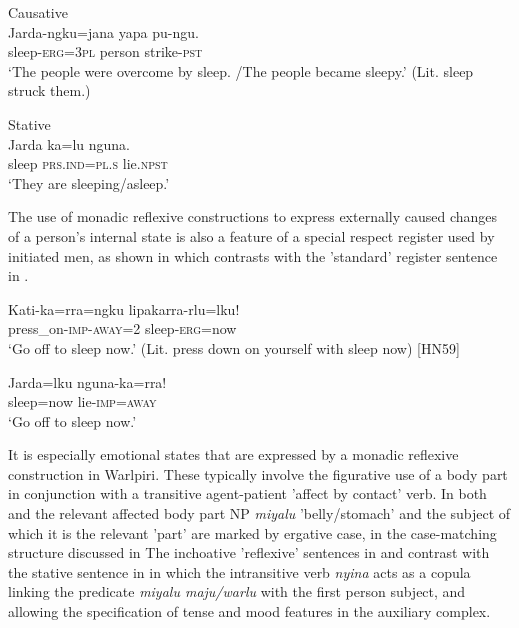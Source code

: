\documentclass[output=paper]{../langscibook}
\begin{document}
\ex Causative\\
\label{ex:laughren:41b}
\gll  Jarda-ngku=jana  yapa  pu-ngu. \\
    sleep-\textsc{erg=3pl}  person  strike-\textsc{pst}\\
\glt `The people were overcome by sleep. /The people became sleepy.'
  (Lit. sleep struck them.)

\ex Stative\\
\label{ex:laughren:41c}
\gll  Jarda  ka=lu  nguna. \\
    sleep  \textsc{prs.ind=pl.s}  lie.\textsc{npst}\\
\glt `They are sleeping/asleep.'
\z
\z


The use of monadic reflexive constructions to express externally caused changes of a person's internal state is also a feature of a special respect register used by initiated men, as shown in  which contrasts with the 'standard' register sentence in .

\ea%
    \label{ex:laughren:42}
\ea
\label{ex:laughren:42a}
\gll  Kati-ka=rra=ngku   lipakarra-rlu=lku!\\
  press\_on-\textsc{imp-away=2}  sleep\textsc{{}-erg=}now\\
\glt `Go off to sleep now.' (Lit. press down on yourself with sleep now) [HN59]

\ex
\label{ex:laughren:42b}
\gll  Jarda=lku   nguna-ka=rra!\\
 sleep=now  lie-\textsc{imp=away}\\
\glt `Go off to sleep now.'
\z
\z


It is especially emotional states that are expressed by a monadic reflexive construction in Warlpiri. These typically involve the figurative use of a body part in conjunction with a transitive agent-patient 'affect by contact' verb. In both  and  the relevant affected body part NP \textit{miyalu} 'belly/stomach' and the subject of which it is the relevant 'part' are marked by ergative case, in the case-matching structure discussed in  The inchoative 'reflexive' sentences in  and  contrast with the stative sentence in  in which the intransitive verb \textit{nyina} acts as a copula linking the predicate \textit{miyalu maju/warlu} with the first person subject, and allowing the specification of tense and mood features in the auxiliary complex.
\end{document}
